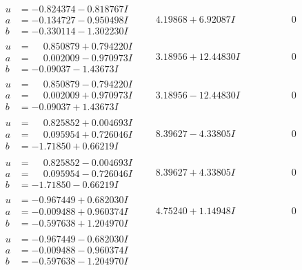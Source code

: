 \documentclass[1p]{elsarticle_modified}
\theoremstyle{definition}
\begin{document}
$$\begin{array}{c|c|c}
\begin{aligned}
u &= -0.824374 - 0.818767 I \\
a &= -0.134727 - 0.950498 I \\
b &= -0.330114 - 1.302230 I\end{aligned}
 & \phantom{-}4.19868 + 6.92087 I & \phantom{-0.000000 } 0 \\ \hline\begin{aligned}
u &= \phantom{-}0.850879 + 0.794220 I \\
a &= \phantom{-}0.002009 - 0.970973 I \\
b &= -0.09037 - 1.43673 I\end{aligned}
 & \phantom{-}3.18956 + 12.44830 I & \phantom{-0.000000 } 0 \\ \hline\begin{aligned}
u &= \phantom{-}0.850879 - 0.794220 I \\
a &= \phantom{-}0.002009 + 0.970973 I \\
b &= -0.09037 + 1.43673 I\end{aligned}
 & \phantom{-}3.18956 - 12.44830 I & \phantom{-0.000000 } 0 \\ \hline\begin{aligned}
u &= \phantom{-}0.825852 + 0.004693 I \\
a &= \phantom{-}0.095954 + 0.726046 I \\
b &= -1.71850 + 0.66219 I\end{aligned}
 & \phantom{-}8.39627 - 4.33805 I & \phantom{-0.000000 } 0 \\ \hline\begin{aligned}
u &= \phantom{-}0.825852 - 0.004693 I \\
a &= \phantom{-}0.095954 - 0.726046 I \\
b &= -1.71850 - 0.66219 I\end{aligned}
 & \phantom{-}8.39627 + 4.33805 I & \phantom{-0.000000 } 0 \\ \hline\begin{aligned}
u &= -0.967449 + 0.682030 I \\
a &= -0.009488 + 0.960374 I \\
b &= -0.597638 + 1.204970 I\end{aligned}
 & \phantom{-}4.75240 + 1.14948 I & \phantom{-0.000000 } 0 \\ \hline\begin{aligned}
u &= -0.967449 - 0.682030 I \\
a &= -0.009488 - 0.960374 I \\
b &= -0.597638 - 1.204970 I\end{aligned}

\end{array}$$
\end{document}
